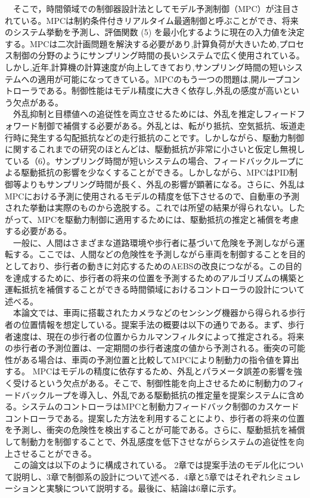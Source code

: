 　そこで，時間領域での制御器設計法としてモデル予測制御（MPC）が注目されている。MPCは制約条件付きリアルタイム最適制御と呼ぶことができ、将来のシステム挙動を予測し、評価関数 (5) を最小化するように現在の入力値を決定する。MPCは二次計画問題を解決する必要があり,計算負荷が大きいため,プロセス制御の分野のようにサンプリング時間の長いシステムで広く使用されている。しかし,近年,計算機の計算速度が向上してきており,サンプリング時間の短いシステムへの適用が可能になってきている。MPCのもう一つの問題は,開ループコントローラである。制御性能はモデル精度に大きく依存し,外乱の感度が高いという欠点がある。\\
　外乱抑制と目標値への追従性を両立させるためには、外乱を推定しフィードフォワード制御で補償する必要がある。外乱とは、転がり抵抗、空気抵抗、坂道走行時に発生する勾配抵抗などの走行抵抗のことです。しかしながら、駆動力制御に関するこれまでの研究のほとんどは、駆動抵抗が非常に小さいと仮定し無視している（6）。サンプリング時間が短いシステムの場合、フィードバックループによる駆動抵抗の影響を少なくすることができる。しかしながら、MPCはPID制御等よりもサンプリング時間が長く、外乱の影響が顕著になる。さらに、外乱はMPCにおける予測に使用されるモデルの精度を低下させるので、自動車の予測された挙動は実際のものから逸脱する。これでは所望の結果が得られない。したがって、MPCを駆動力制御に適用するためには、駆動抵抗の推定と補償を考慮する必要がある。\\
　一般に、人間はさまざまな道路環境や歩行者に基づいて危険を予測しながら運転する。ここでは、人間などの危険性を予測しながら車両を制御することを目的としており、歩行者の動きに対応するためのAEBSの改良につながる。この目的を達成するために、歩行者の将来の位置を予測するためのアルゴリズムの構築と運転抵抗を補償することができる時間領域におけるコントローラの設計について述べる。\\
　本論文では、車両に搭載されたカメラなどのセンシング機器から得られる歩行者の位置情報を想定している。提案手法の概要は以下の通りである。まず、歩行者速度は、現在の歩行者の位置からカルマンフィルタによって推定される。将来の歩行者の予測位置は、一定期間の歩行者速度の値から予測される。衝突の可能性がある場合は、車両の予測位置と比較してMPCにより制動力の指令値を算出する。 MPCはモデルの精度に依存するため、外乱とパラメータ誤差の影響を強く受けるという欠点がある。そこで、制御性能を向上させるために制動力のフィードバックループを導入し、外乱である駆動抵抗の推定量を提案システムに含める。システムのコントローラはMPCと制動力フィードバック制御のカスケードコントローラである。提案した方法を利用することにより、歩行者の将来の位置を予測し、衝突の危険性を検出することが可能である。さらに、駆動抵抗を補償して制動力を制御することで、外乱感度を低下させながらシステムの追従性を向上させることができる。\\
　この論文は以下のように構成されている。 2章では提案手法のモデル化について説明し、3章で制御系の設計について述べる．4章と5章ではそれぞれシミュレーションと実験について説明する。最後に、結論は6章に示す。\\


